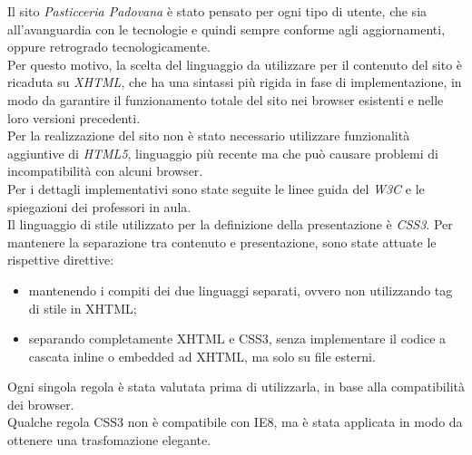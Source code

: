 Il sito \emph{Pasticceria Padovana} è stato pensato per ogni tipo di utente, che sia all'avanguardia con le tecnologie 
e quindi sempre conforme agli aggiornamenti, oppure retrogrado tecnologicamente.\\
Per questo motivo, la scelta del linguaggio da utilizzare per il contenuto del sito è ricaduta su \emph{XHTML},
che ha una sintassi più rigida in fase di implementazione, in modo da garantire il funzionamento totale del sito nei browser esistenti 
e nelle loro versioni precedenti.\\
Per la realizzazione del sito non è stato necessario utilizzare funzionalità aggiuntive di \emph{HTML5}, linguaggio più recente ma che può causare
problemi di incompatibilità con alcuni browser.\\
Per i dettagli implementativi sono state seguite le linee guida del \emph{W3C} e le spiegazioni dei professori in aula.\\
Il linguaggio di stile utilizzato per la definizione della presentazione è \emph{CSS3}. 
Per mantenere la separazione tra contenuto e presentazione, sono state attuate le rispettive direttive: 
\begin{itemize}
    \item mantenendo i compiti dei due linguaggi separati, ovvero non utilizzando tag di stile in XHTML;
    \item separando completamente XHTML e CSS3, senza implementare il codice a cascata inline o embedded ad XHTML, ma solo su file esterni.
\end{itemize}
Ogni singola regola è stata valutata prima di utilizzarla, in base alla compatibilità dei browser.\\
Qualche regola CSS3 non è compatibile con IE8, ma è stata applicata in modo da ottenere una trasfomazione elegante.


